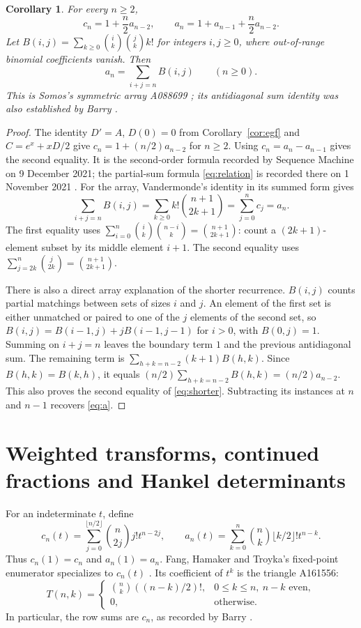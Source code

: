\documentclass[11pt]{article}
\newtheorem{corollary}{Corollary}
\begin{document}
\begin{corollary}\label{cor:shorter}
For every $n\geq2$,
\begin{equation}\label{eq:shorter}
 c_n=1+\frac n2a_{n-2},\qquad
 a_n=1+a_{n-1}+\frac n2a_{n-2}.
\end{equation}
Let $B(i,j)=\sum_{k\geq0}\binom ik\binom jk k!$ for integers $i,j\geq0$,
where out-of-range binomial coefficients vanish. Then
\begin{equation}\label{eq:somos}
 a_n=\sum_{i+j=n}B(i,j)\qquad(n\geq0).
\end{equation}
This is Somos's symmetric array A088699 \cite{somos}; its antidiagonal
sum identity was also established by Barry
\cite[Section~13.2, pp.~283--284]{barry-thesis}.
\end{corollary}
\begin{proof}
The identity $D'=A$, $D(0)=0$ from Corollary~\ref{cor:egf} and
$C=e^x+xD/2$ give $c_n=1+(n/2)a_{n-2}$ for $n\geq2$.
Using $c_n=a_n-a_{n-1}$ gives the second equality.
It is the second-order formula recorded by Sequence Machine on
9 December 2021; the partial-sum formula \eqref{eq:relation} is recorded
there on 1 November 2021 \cite{sequence-machine}.
For the array, Vandermonde's identity in its summed form gives
\[
 \sum_{i+j=n}B(i,j)
 =\sum_{k\geq0}k!\binom{n+1}{2k+1}
 =\sum_{j=0}^nc_j=a_n.
\]
The first equality uses
$\sum_{i=0}^n\binom ik\binom{n-i}k=\binom{n+1}{2k+1}$:
count a $(2k+1)$-element subset by its middle element $i+1$.
The second equality uses
$\sum_{j=2k}^n\binom j{2k}=\binom{n+1}{2k+1}$.

There is also a direct array explanation of the shorter recurrence.
$B(i,j)$ counts partial matchings between sets of sizes $i$ and $j$.
An element of the first set is either unmatched or paired to one of
the $j$ elements of the second set, so
$B(i,j)=B(i-1,j)+jB(i-1,j-1)$ for $i>0$, with $B(0,j)=1$.
Summing on $i+j=n$ leaves the boundary term $1$ and the previous
antidiagonal sum. The remaining term is
$\sum_{h+k=n-2}(k+1)B(h,k)$. Since $B(h,k)=B(k,h)$, it equals
$(n/2)\sum_{h+k=n-2}B(h,k)=(n/2)a_{n-2}$.
This also proves the second equality of \eqref{eq:shorter}.
Subtracting its instances at $n$ and $n-1$ recovers \eqref{eq:a}.
\end{proof}

\section{Weighted transforms, continued fractions and Hankel determinants}
For an indeterminate $t$, define
\[
 c_n(t)=\sum_{j=0}^{\lfloor n/2\rfloor}\binom n{2j}j!t^{n-2j},\qquad
 a_n(t)=\sum_{k=0}^{n}\binom nk\lfloor k/2\rfloor!t^{n-k}.
\]
Thus $c_n(1)=c_n$ and $a_n(1)=a_n$.
Fang, Hamaker and Troyka's fixed-point enumerator specializes to
$c_n(t)$ \cite[Proposition~4.13 and its following example]{fht}.
Its coefficient of $t^k$ is the triangle A161556:
\[
 T(n,k)=
 \begin{cases}\binom nk((n-k)/2)!,&0\leq k\leq n,\ n-k\text{ even},\\
 0,&\text{otherwise}.
 \end{cases}
\]
In particular, the row sums are $c_n$, as recorded by Barry
\cite{oeis-triangle}.
\end{document}

